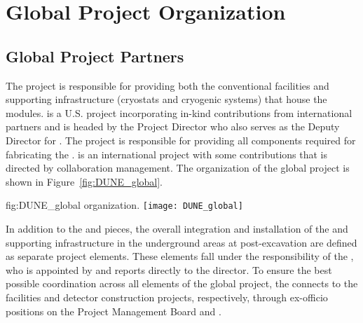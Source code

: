 \chapter{Global Project Organization}
\label{vl:tc-global}

\section{Global Project Partners}
\label{sec:partners}

The  project is responsible for providing both the conventional
facilities and supporting infrastructure (cryostats and cryogenic
systems) that house the   modules.  is a
U.S.  project incorporating in-kind contributions from
international partners and is headed by the  Project Director who
also serves as the  Deputy Director for .  The 
project is responsible for providing all components required for
fabricating the .  is an international project
with some  contributions that is directed by 
collaboration management. The organization of the global project 
is shown in Figure~\ref{fig:DUNE_global}.
\begin{dunefigure}{fig:DUNE_global}
  { organization.}
  \texttt{[image: DUNE\_global]}
\end{dunefigure}

In addition to the  and  pieces, the overall
integration and installation of the  and supporting
 infrastructure in the underground areas at 
post-excavation are defined as separate project elements.  These
elements fall under the responsibility of the , who is
appointed by and reports directly to the  director.  To ensure
the best possible coordination across all elements of the global
project, the  connects to the facilities and detector
construction projects, respectively, through ex-officio positions on
the  Project Management Board and 
.

